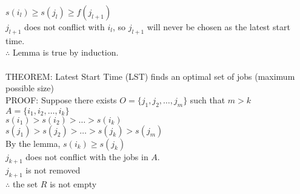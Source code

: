 \documentclass[11pt,letterpaper]{article}
\newcommand\tab[1][1cm]{\hspace*{#1}}
\begin{document}
\tab \tab \tab $s(i_l) \geq s(j_l) \geq f(j_{l+1})$ \\
\tab \tab \tab $j_{l+1}$ does not conflict with $i_l$, so $j_{l+1}$ will never be chosen as the latest start time. \\
\tab \tab $\therefore$ Lemma is true by induction. \\\\
THEOREM: Latest Start Time (LST) finds an optimal set of jobs (maximum possible size) \\
PROOF: Suppose there exists $O = \{j_1, j_2, \dots, j_m\}$ such that $m > k$ \\
\tab $A = \{i_1, i_2, \dots, i_k\}$ \\
\tab $s(i_1) > s(i_2) > \dots > s(i_k)$ \\
\tab $s(j_1) > s(j_2) > \dots > s(j_k) > s(j_m)$ \\
By the lemma, $s(i_k) \geq s(j_k)$ \\
\tab \tab $j_{k+1}$ does not conflict with the jobs in $A$. \\
\tab \tab $j_{k+1}$ is not removed \\
\tab \tab $\therefore$ the set $R$ is not empty \\

\pagebreak

\end{document}
